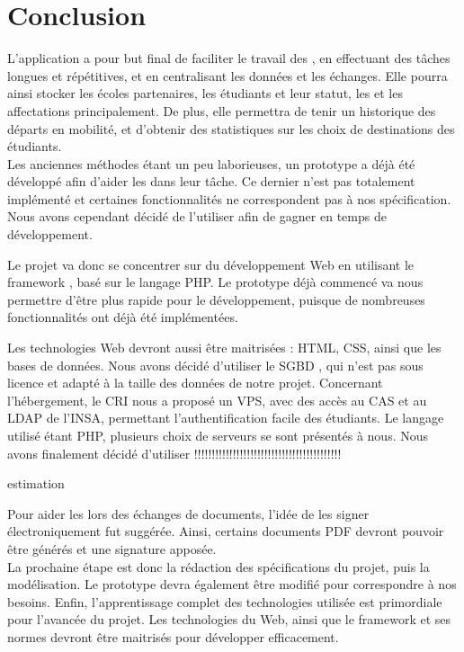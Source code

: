 
	\chapter*{Conclusion}

L'application a pour but final de faciliter le travail des \ris, en effectuant des tâches longues et répétitives, et en centralisant les données et les échanges. Elle pourra ainsi stocker les écoles partenaires, les étudiants et leur statut, les \voe et les affectations principalement. De plus, elle permettra de tenir un historique des départs en mobilité, et d'obtenir des statistiques sur les choix de destinations des étudiants. \\

Les anciennes méthodes étant un peu laborieuses, un prototype a déjà été développé afin d'aider les \ris dans leur tâche. Ce dernier n'est pas totalement implémenté et certaines fonctionnalités ne correspondent pas à nos spécification. Nous avons cependant décidé de l'utiliser afin de gagner en temps de développement.

Le projet va donc se concentrer sur du développement Web en utilisant le framework \symfony, basé sur le langage PHP.
Le prototype déjà commencé va nous permettre d'être plus rapide pour le développement, puisque de nombreuses fonctionnalités ont déjà été implémentées. 

Les technologies Web devront aussi être maitrisées : HTML, CSS, ainsi que les bases de données. Nous avons décidé d'utiliser le SGBD \mdb, qui n'est pas sous licence et adapté à la taille des données de notre projet. Concernant l'hébergement, le CRI nous a proposé un VPS, avec des accès au CAS et au LDAP de l'INSA, permettant l'authentification facile des étudiants. Le langage utilisé étant PHP, plusieurs choix de serveurs se sont présentés à nous. Nous avons finalement décidé d'utiliser !!!!!!!!!!!!!!!!!!!!!!!!!!!!!!!!!!!!!!!!!!

estimation


Pour aider les \ris lors des échanges de documents, l'idée de les signer électroniquement fut suggérée. Ainsi, certains documents PDF devront pouvoir être générés et une signature apposée. \\

La prochaine étape est donc la rédaction des spécifications du projet, puis la modélisation. Le prototype devra également être modifié pour correspondre à nos besoins. Enfin, l'apprentissage complet des technologies utilisée est primordiale pour l'avancée du projet. Les technologies du Web, ainsi que le framework \symfony et ses normes devront être maitrisés pour développer efficacement.